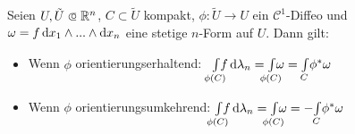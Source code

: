 \documentclass{cheat-sheet}
\theoremstyle{definition}
\newcommand{\Intdf}[2]{{\textstyle \int\limits_{#1}} #2} %
\begin{document}
\begin{satz}
  Seien $U, \tilde{U} \opn \R^n$, $C \subset \tilde{U}$ kompakt, $\phi : \tilde{U} \to U$ ein $\mathcal{C}^1$-Diffeo und $\omega = f \, \mathrm{d} x_1 \wedge ... \wedge \mathrm{d} x_n$ eine stetige $n$-Form auf $U$. Dann gilt:
  \begin{itemize}
    \item Wenn $\phi$ orientierungserhaltend: \quad\, $\Int{\mathclap{\phi(C)}}{}{f}{\lambda_n} = \Intdf{\mathclap{\phi(C)}}{\omega} = \Intdf{C}{\phi^* \omega}$
    \item Wenn $\phi$ orientierungsumkehrend: \enspace $\Int{\mathclap{\phi(C)}}{}{f}{\lambda_n} = \Intdf{\mathclap{\phi(C)}}{\omega} = -\Intdf{C}{\phi^* \omega}$
  \end{itemize}
\end{satz}
\end{document}
